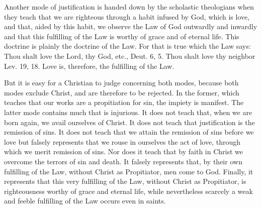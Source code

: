 Another mode of justification is handed down by the scholastic
theologians when they teach that we are righteous through a habit
infused by God, which is love, and that, aided by this habit, we
observe the Law of God outwardly and inwardly and that this
fulfilling of the Law is worthy of grace and of eternal life.  This
doctrine is plainly the doctrine of the Law.  For that is true which
the Law says: Thou shalt love the Lord, thy God, etc., Deut. 6, 5.
Thou shalt love thy neighbor Lev. 19, 18. Love is, therefore, the
fulfilling of the Law.

But it is easy for a Christian to judge concerning both modes,
because both modes exclude Christ, and are therefore to be rejected.
In the former, which teaches that our works are a propitiation for
sin, the impiety is manifest.  The latter mode contains much that is
injurious.  It does not teach that, when we are born again, we avail
ourselves of Christ.  It does not teach that justification is the
remission of sins.  It does not teach that we attain the remission of
sins before we love but falsely represents that we rouse in ourselves
the act of love, through which we merit remission of sins.  Nor does
it teach that by faith in Christ we overcome the terrors of sin and
death.  It falsely represents that, by their own fulfilling of the
Law, without Christ as Propitiator, men come to God.  Finally, it
represents that this very fulfilling of the Law, without Christ as
Propitiator, is righteousness worthy of grace and eternal life, while
nevertheless scarcely a weak and feeble fulfilling of the Law occurs
even in saints.

